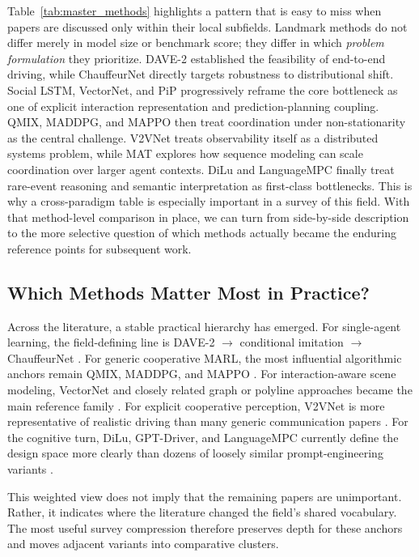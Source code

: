 \documentclass[12pt, a4paper]{article}
\begin{document}
\noindent Table~\ref{tab:master_methods} highlights a pattern that is easy to
miss when papers are discussed only within their local subfields. Landmark
methods do not differ merely in model size or benchmark score; they differ in
which \emph{problem formulation} they prioritize. DAVE-2 established the
feasibility of end-to-end driving, while ChauffeurNet directly targets
robustness to distributional shift. Social LSTM, VectorNet, and
PiP progressively reframe the core bottleneck as one of explicit interaction
representation and prediction-planning coupling. QMIX, MADDPG, and MAPPO then
treat coordination under non-stationarity as the central challenge. V2VNet
treats observability itself as a distributed systems problem, while MAT explores
how sequence modeling can scale coordination over larger agent contexts. DiLu
and LanguageMPC finally treat rare-event reasoning and semantic interpretation
as first-class bottlenecks. This is why a cross-paradigm table is especially
important in a survey of this field. With that method-level comparison in place,
we can turn from side-by-side description to the more selective question of
which methods actually became the enduring reference points for subsequent work.

\subsection{Which Methods Matter Most in Practice?}

Across the literature, a stable practical hierarchy has emerged. For
single-agent learning, the field-defining line is DAVE-2 $\rightarrow$
conditional imitation $\rightarrow$ ChauffeurNet
\cite{bojarski2016end,codevilla2018end,bansal2018chauffeur}. For generic
cooperative MARL, the most influential algorithmic anchors remain QMIX,
MADDPG, and MAPPO \cite{rashid2018qmix,lowe2017multi,yu2021surprising}. For
interaction-aware scene modeling, VectorNet and closely related graph or
polyline approaches became the main reference family
\cite{gao2020vectornet,liang2020lanegcn,salzmann2020trajectron}. For explicit
cooperative perception, V2VNet is more representative of realistic driving than
many generic communication papers \cite{wang2020v2vnet}. For the cognitive turn,
DiLu, GPT-Driver, and LanguageMPC currently define the design space more clearly
than dozens of loosely similar prompt-engineering variants
\cite{wen2023dilu,mao2023gpt,sha2023languagempc}.

This weighted view does not imply that the remaining papers are unimportant.
Rather, it indicates where the literature changed the field's shared vocabulary.
The most useful survey compression therefore preserves depth for these anchors
and moves adjacent variants into comparative clusters.
\end{document}
